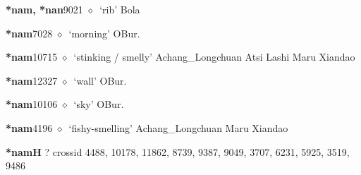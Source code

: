   \begin{list}{}{\leftmargin=1.5em \itemindent=-1.5em}
  \item {\footnotesize \textbf{*nam, *nan}}{\tiny 9021}
         $\diamond$~`rib'
         Bola 
  \item {\footnotesize \textbf{*nam}}{\tiny 7028}
\hspace{1ex}
         $\diamond$~`morning'
         OBur. 
  \item {\footnotesize \textbf{*nam}}{\tiny 10715}
\hspace{1ex}
         $\diamond$~`stinking / smelly'
         Achang\_Longchuan 
\hspace{1ex}
         Atsi 
\hspace{1ex}
         Lashi 
\hspace{1ex}
         Maru 
\hspace{1ex}
         Xiandao 
  \item {\footnotesize \textbf{*nam}}{\tiny 12327}
\hspace{1ex}
         $\diamond$~`wall'
         OBur. 
  \item {\footnotesize \textbf{*nam}}{\tiny 10106}
\hspace{1ex}
         $\diamond$~`sky'
         OBur. 
  \item {\footnotesize \textbf{*nam}}{\tiny 4196}
\hspace{1ex}
         $\diamond$~`fishy-smelling'
         Achang\_Longchuan 
\hspace{1ex}
         Maru 
\hspace{1ex}
         Xiandao 
  \end{list}
\item
\textbf{*namH}
?
  {\tiny crossid 4488, 10178, 11862, 8739, 9387, 9049, 3707, 6231, 5925, 3519, 9486}
